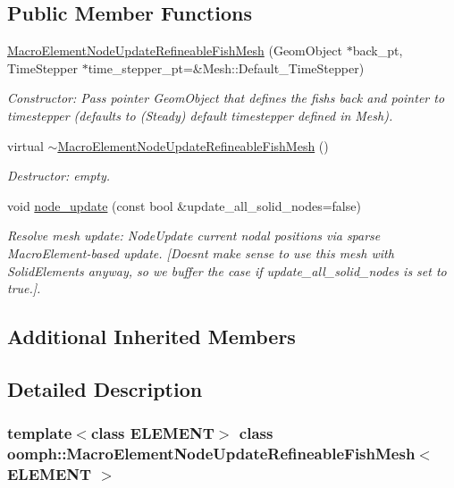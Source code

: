 \subsection*{Public Member Functions}
\begin{DoxyCompactItemize}
\item 
\hyperlink{classoomph_1_1MacroElementNodeUpdateRefineableFishMesh_a7adcb19be3d66c63d88bf87d4822dacc}{Macro\+Element\+Node\+Update\+Refineable\+Fish\+Mesh} (Geom\+Object $\ast$back\+\_\+pt, Time\+Stepper $\ast$time\+\_\+stepper\+\_\+pt=\&Mesh\+::\+Default\+\_\+\+Time\+Stepper)
\begin{DoxyCompactList}\small\item\em Constructor\+: Pass pointer Geom\+Object that defines the fish\textquotesingle{}s back and pointer to timestepper (defaults to (Steady) default timestepper defined in Mesh). \end{DoxyCompactList}\item 
virtual \hyperlink{classoomph_1_1MacroElementNodeUpdateRefineableFishMesh_a68cdd294ca61ad64dbcd1313356d2ca4}{$\sim$\+Macro\+Element\+Node\+Update\+Refineable\+Fish\+Mesh} ()
\begin{DoxyCompactList}\small\item\em Destructor\+: empty. \end{DoxyCompactList}\item 
void \hyperlink{classoomph_1_1MacroElementNodeUpdateRefineableFishMesh_a1008dd9faa50699dcef68c8c35d6979c}{node\+\_\+update} (const bool \&update\+\_\+all\+\_\+solid\+\_\+nodes=false)
\begin{DoxyCompactList}\small\item\em Resolve mesh update\+: Node\+Update current nodal positions via sparse Macro\+Element-\/based update. \mbox{[}Doesn\textquotesingle{}t make sense to use this mesh with Solid\+Elements anyway, so we buffer the case if update\+\_\+all\+\_\+solid\+\_\+nodes is set to true.\mbox{]}. \end{DoxyCompactList}\end{DoxyCompactItemize}
\subsection*{Additional Inherited Members}


\subsection{Detailed Description}
\subsubsection*{template$<$class E\+L\+E\+M\+E\+NT$>$\newline
class oomph\+::\+Macro\+Element\+Node\+Update\+Refineable\+Fish\+Mesh$<$ E\+L\+E\+M\+E\+N\+T $>$}


